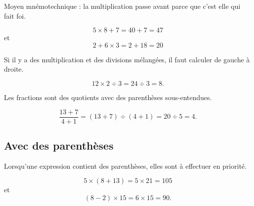 Moyen mnémotechnique : la multiplication passe avant parce que c'est elle qui fait foi.

\begin{example}
    \begin{equation}
        5\times 8+7=40+7=47
    \end{equation}
    et
    \begin{equation}
        2+6\times 3=2+18=20
    \end{equation}
\end{example}

\begin{remark}
    Si il y a des multiplication et des divisions mélangées, il faut calculer de gauche à droite.
\end{remark}

\begin{example}
    \begin{equation}
        12\times 2\div 3=24\div 3=8.
    \end{equation}
\end{example}

\begin{remark}
    Les fractions sont des quotients avec des parenthèses sous-entendues.
\end{remark}

\begin{example}
    \begin{equation}
        \frac{ 13+7 }{ 4+1 }=(13+7)\div (4+1)=20\div 5=4.
    \end{equation}
\end{example}

\subsection{Avec des parenthèses}

\begin{Aretenir}
    Lorsqu'une expression contient des parenthèses, elles sont à effectuer en priorité.
\end{Aretenir}

\begin{example}
    \begin{equation}
        5\times (8+13)=5\times 21=105
    \end{equation}
    et
    \begin{equation}
         (8-2)\times 15=6\times 15=90.
    \end{equation}
\end{example}


